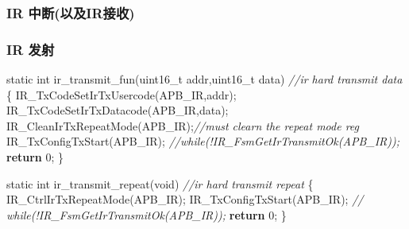 \documentclass[
  12pt,
]{book}
\newenvironment{Shaded}{\begin{snugshade}}{\end{snugshade}}
\newcommand{\CommentTok}[1]{\textcolor[rgb]{0.56,0.35,0.01}{\textit{#1}}}
\newcommand{\ControlFlowTok}[1]{\textcolor[rgb]{0.13,0.29,0.53}{\textbf{#1}}}
\newcommand{\DataTypeTok}[1]{\textcolor[rgb]{0.13,0.29,0.53}{#1}}
\newcommand{\DecValTok}[1]{\textcolor[rgb]{0.00,0.00,0.81}{#1}}
\newcommand{\NormalTok}[1]{#1}
\newcommand{\SpecialCharTok}[1]{\textcolor[rgb]{0.00,0.00,0.00}{#1}}
\newcommand{\StringTok}[1]{\textcolor[rgb]{0.31,0.60,0.02}{#1}}
\begin{document}
\hypertarget{ir-ux4e2dux65adux4ee5ux53cairux63a5ux6536}{%
\subsubsection{IR 中断(以及IR接收)}\label{ir-ux4e2dux65adux4ee5ux53cairux63a5ux6536}}

\begin{Shaded}
\end{Shaded}

\hypertarget{ir-ux53d1ux5c04}{%
\subsubsection{IR 发射}\label{ir-ux53d1ux5c04}}

\begin{Shaded}
\begin{Highlighting}[]
\DataTypeTok{static} \DataTypeTok{int}\NormalTok{ ir_transmit_fun(}\DataTypeTok{uint16_t}\NormalTok{ addr,}\DataTypeTok{uint16_t}\NormalTok{ data) }\CommentTok{//ir hard transmit data}
\NormalTok{\{}
\NormalTok{    IR_TxCodeSetIrTxUsercode(APB_IR,addr);}
\NormalTok{    IR_TxCodeSetIrTxDatacode(APB_IR,data);}
\NormalTok{    IR_CleanIrTxRepeatMode(APB_IR);}\CommentTok{//must clearn the repeat mode reg}
\NormalTok{    IR_TxConfigTxStart(APB_IR);}
    \CommentTok{//while(!IR_FsmGetIrTransmitOk(APB_IR));}
    \ControlFlowTok{return} \DecValTok{0}\NormalTok{;}
\NormalTok{\}}

\DataTypeTok{static} \DataTypeTok{int}\NormalTok{ ir_transmit_repeat(}\DataTypeTok{void}\NormalTok{) }\CommentTok{//ir hard transmit repeat}
\NormalTok{\{}
\NormalTok{    IR_CtrlIrTxRepeatMode(APB_IR);   }
\NormalTok{    IR_TxConfigTxStart(APB_IR);}
 \CommentTok{//   while(!IR_FsmGetIrTransmitOk(APB_IR)); }
    \ControlFlowTok{return} \DecValTok{0}\NormalTok{;}
\NormalTok{\}}
\end{Highlighting}
\end{Shaded}
\end{document}
